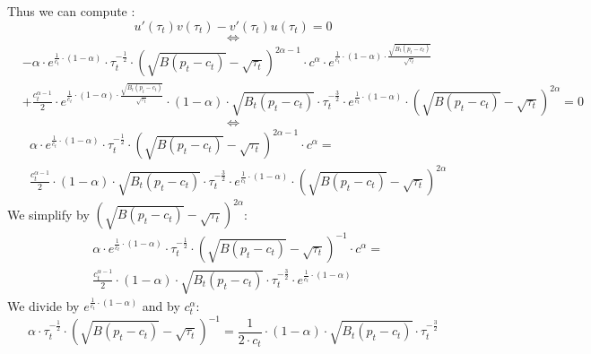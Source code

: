 \documentclass{article}
\begin{document}
Thus we can compute : 
\begin{equation*}
    u'(\tau_{t})v(\tau_{t})-v'(\tau_{t})u(\tau_{t})=0
\end{equation*}
$$\iff$$
\begin{equation*}
    \begin{split}
    & -\alpha\cdot e^{\frac{1}{c_{t}}\cdot\left(1-\alpha\right)}\cdot \tau_{t}^{-\frac{1}{2}}\cdot \left(\sqrt{B(p_{t}-c_{t})}-\sqrt{\tau_{t}}\right)^{2\alpha-1} \cdot  c^{\alpha}\cdot e^{\frac{1}{c_{t}}\cdot(1-\alpha)\cdot\frac{\sqrt{B_{t}(p_{t}-c_{t})}}{\sqrt{\tau_{t}}}} \\
    & +\frac{c_{t}^{\alpha-1}}{2}\cdot e^{\frac{1}{c_{t}}\cdot(1-\alpha)\cdot\frac{\sqrt{B_{t}(p_{t}-c_{t})}}{\sqrt{\tau_{t}}}}\cdot (1-\alpha)\cdot\sqrt{B_{t}(p_{t}-c_{t})}\cdot\tau_{t}^{-\frac{3}{2}}\cdot e^{\frac{1}{c_{t}}\cdot\left(1-\alpha\right)}\cdot\left(\sqrt{B(p_{t}-c_{t})}-\sqrt{\tau_{t}}\right)^{2\alpha}=0
    \end{split}
\end{equation*}
$$\iff$$
\begin{equation*}
    \begin{split}
    & \alpha\cdot e^{\frac{1}{c_{t}}\cdot\left(1-\alpha\right)}\cdot \tau_{t}^{-\frac{1}{2}}\cdot \left(\sqrt{B(p_{t}-c_{t})}-\sqrt{\tau_{t}}\right)^{2\alpha-1} \cdot  c^{\alpha} = \\
    & \frac{c_{t}^{\alpha-1}}{2}\cdot (1-\alpha)\cdot\sqrt{B_{t}(p_{t}-c_{t})}\cdot\tau_{t}^{-\frac{3}{2}}\cdot e^{\frac{1}{c_{t}}\cdot\left(1-\alpha\right)}\cdot\left(\sqrt{B(p_{t}-c_{t})}-\sqrt{\tau_{t}}\right)^{2\alpha}
    \end{split}
\end{equation*}
We simplify by $\left(\sqrt{B(p_{t}-c_{t})}-\sqrt{\tau_{t}}\right)^{2\alpha}$:
\begin{equation*}
    \begin{split}
    & \alpha\cdot e^{\frac{1}{c_{t}}\cdot\left(1-\alpha\right)}\cdot \tau_{t}^{-\frac{1}{2}}\cdot \left(\sqrt{B(p_{t}-c_{t})}-\sqrt{\tau_{t}}\right)^{-1} \cdot  c^{\alpha} = \\
    & \frac{c_{t}^{\alpha-1}}{2}\cdot (1-\alpha)\cdot\sqrt{B_{t}(p_{t}-c_{t})}\cdot\tau_{t}^{-\frac{3}{2}}\cdot e^{\frac{1}{c_{t}}\cdot\left(1-\alpha\right)}
    \end{split}
\end{equation*}
We divide by $e^{\frac{1}{c_{t}}\cdot\left(1-\alpha\right)}$ and by $c_{t}^{\alpha}$:
\begin{equation*}
    \alpha\cdot \tau_{t}^{-\frac{1}{2}}\cdot \left(\sqrt{B(p_{t}-c_{t})}-\sqrt{\tau_{t}}\right)^{-1} = \frac{1}{2\cdot c_{t}}\cdot (1-\alpha)\cdot\sqrt{B_{t}(p_{t}-c_{t})}\cdot\tau_{t}^{-\frac{3}{2}} 
\end{equation*}
\end{document}
